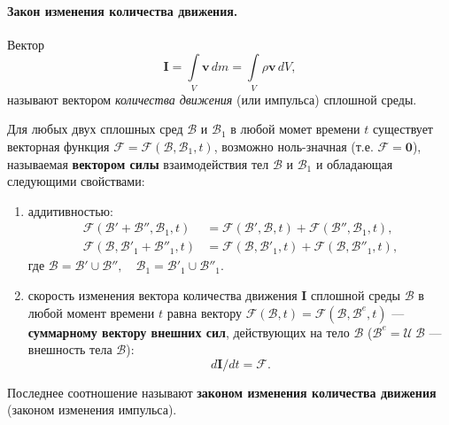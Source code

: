 
\paragraph{Закон изменения количества движения.} 
\begin{definition*}
	Вектор 
	\begin{equation*}
		\mathbf{I} = \int\limits_{V} \mathbf{v} \, dm = \int\limits_{V} \rho \mathbf{v} \, dV,
	\end{equation*}
	называют вектором \textit{количества движения} (или импульса) сплошной среды.
\end{definition*}

\begin{axiom}
	Для любых двух сплошных сред $\mathcal{B}$ и $\mathcal{B}_1$ в любой момет времени $t$ существует векторная функция $\mathcal{F} = \mathcal{F}(\mathcal{B}, \mathcal{B}_1, t)$, возможно ноль-значная (т.е. $\mathcal{F} = \mathbf{0}$), называемая \textbf{вектором силы} взаимодействия тел $\mathcal{B}$ и $\mathcal{B}_1$ и обладающая следующими свойствами:
	\begin{enumerate}
		\item аддитивностью:
		\begin{align*}
			\mathcal{F}(\mathcal{B}' + \mathcal{B}'', \mathcal{B}_1, t) &= \mathcal{F}(\mathcal{B}', \mathcal{B}, t) + \mathcal{F}(\mathcal{B}'', \mathcal{B}_1, t), \\
			\mathcal{F}(\mathcal{B}, \mathcal{B}'_1 + \mathcal{B}''_1, t) &= \mathcal{F}(\mathcal{B}, \mathcal{B}'_1, t) + \mathcal{F}(\mathcal{B}, \mathcal{B}''_1, t),
		\end{align*}
		где $\mathcal{B} = \mathcal{B}' \cup \mathcal{B}'', \quad \mathcal{B}_1 = \mathcal{B}'_1 \cup \mathcal{B}''_1$.
		
		\item скорость изменения вектора количества движения $\mathbf{I}$ сплошной среды $\mathcal{B}$ в любой момент времени $t$ равна вектору $\mathcal{F}(\mathcal{B}, t) = \mathcal{F}(\mathcal{B}, \mathcal{B}^{e}, t)$ --- \textbf{суммарному вектору внешних сил}, действующих на тело $\mathcal{B}$ ($\mathcal{B}^{e} = \mathcal{U} \ \mathcal{B}$ --- внешность тела $\mathcal{B}$):
		\begin{equation*}
			d\mathbf{I} / dt = \mathcal{F}.
		\end{equation*}
	\end{enumerate}
	
	Последнее соотношение называют \textbf{законом изменения количества движения} (законом изменения импульса).
\end{axiom}

